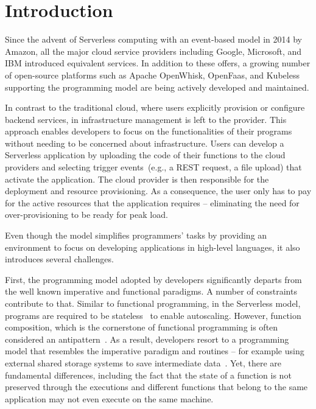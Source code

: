 
\section{Introduction}

Since the advent of Serverless computing with an event-based \faas model in 2014 by 
Amazon,
all the major cloud service providers including 
Google,
Microsoft,
and IBM
introduced equivalent services. 
%
In addition to these offers, a growing number of open-source platforms 
such as Apache OpenWhisk,
OpenFaas,
and Kubeless
supporting the \faas programming model are being actively developed and maintained.

In contrast to the traditional cloud, where users explicitly provision or configure 
backend services, in \faas infrastructure management is left to the provider.
This approach enables developers to focus on the functionalities of their programs 
without needing to be concerned about infrastructure. 
Users can develop a Serverless application by uploading the code of their 
functions to the cloud providers and selecting trigger events~(e.g., a REST request, 
a file upload) that activate the application. The cloud provider is then responsible for 
the deployment and resource provisioning. As a consequence, the user only has 
to pay for the active resources that the application requires -- eliminating the 
need for over-provisioning to be ready for peak load.

Even though the \faas model simplifies programmers' tasks by providing 
an environment to focus on developing applications in high-level 
languages, it also introduces several challenges.

First, the programming model adopted by developers 
significantly departs from the well known imperative and functional paradigms.
A number of constraints contribute to that.
Similar to functional programming, in the Serverless model, 
programs are required to be stateless~\cite{hellerstein2018serverless} to enable autoscaling.
However, function composition, which is the cornerstone of functional programming
is often considered an antipattern~\cite{baldini2017serverless}.
%
As a result, developers resort to a programming model that 
resembles the imperative paradigm and routines --
for example using external shared 
storage systems to save intermediate data~\cite{klimovic2018understanding}.
Yet, there are fundamental differences, including the fact that 
the state of a function is not preserved through the executions and
different functions that belong to the same application may not even execute 
on the same machine.

